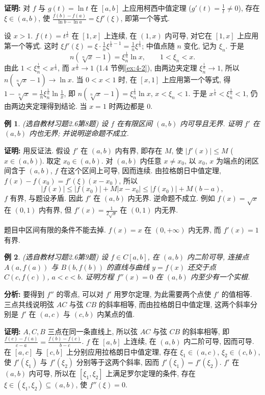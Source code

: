 \documentclass[UTF8,openany]{ctexbook}
\theoremstyle{chinesetextbook}
\newtheorem{example}{例}[section]
\newenvironment{cnproof}{\par\indent\textbf{证明:} \ignorespaces}{\par}
\begin{document}
\begin{cnproof}
对 $f$ 与 $g(t)=\ln t$ 在 $[a,b]$ 上应用柯西中值定理 ($\displaystyle g'(t)=\frac1t\ne0$), 存在 $\xi\in(a,b)$, 使 $\displaystyle\frac{f(b)-f(a)}{\ln b-\ln a}=\xi f'(\xi)$, 即第一个等式.

设 $x>1$. $f(t)=t^{\frac1n}$ 在 $[1,x]$ 上连续, 在 $(1,x)$ 内可导, 对它在 $[1,x]$ 上应用第一个等式. 这时 $\displaystyle\xi f'(\xi)=\xi\cdot\frac1n\xi^{\frac1n-1}=\frac1n\xi^{\frac1n}$; 中值点随 $n$ 变化, 记为 $\xi_n$. 于是
\[
n\left(\sqrt[n]x-1\right)=\xi_n^{\frac1n}\ln x,\qquad1<\xi_n<x.
\]
由此 $1<\xi_n^{\frac1n}<x^{\frac1n}$, 而 $x^{\frac1n}\to1$ (1.4 节例\ref{ex:4-2}), 由两边夹定理 $\xi_n^{\frac1n}\to1$, 所以 $n\left(\sqrt[n]x-1\right)\to\ln x$. 当 $0<x<1$ 时, 在 $[x,1]$ 上应用第一个等式, 得 $\displaystyle1-\sqrt[n]x=\frac1n\xi_n^{\frac1n}\ln\frac1x$, 即 $n\left(\sqrt[n]x-1\right)=\xi_n^{\frac1n}\ln x$, $x<\xi_n<1$. 于是 $x^{\frac1n}<\xi_n^{\frac1n}<1$, 仍由两边夹定理得到结论. 当 $x=1$ 时两边都是 $0$.
\end{cnproof}
\begin{example}\label{ex:c2-h6-8}
\textnormal{(选自教材习题2.6第8题)} 设 $f$ 在有限区间 $(a,b)$ 内可导且无界. 证明 $f'$ 在 $(a,b)$ 内也无界; 并说明逆命题不成立.
\end{example}
\begin{cnproof}
用反证法. 假设 $f'$ 在 $(a,b)$ 内有界, 即存在 $M$, 使 $|f'(x)|\le M$ ($x\in(a,b)$). 取定 $x_0\in(a,b)$. 对 $(a,b)$ 内任意 $x\ne x_0$, 以 $x_0$, $x$ 为端点的闭区间含于 $(a,b)$, $f$ 在这个区间上可导, 因而连续. 由拉格朗日中值定理, $f(x)-f(x_0)=f'(\xi)(x-x_0)$, 所以
\[
|f(x)|\le|f(x_0)|+M|x-x_0|\le|f(x_0)|+M(b-a),
\]
$f$ 有界, 与题设矛盾. 因此 $f'$ 在 $(a,b)$ 内无界. 逆命题不成立. 例如 $f(x)=\sqrt x$ 在 $(0,1)$ 内有界, 但 $\displaystyle f'(x)=\frac1{2\sqrt x}$ 在 $(0,1)$ 内无界.
\end{cnproof}
题目中区间有限的条件不能去掉. $f(x)=x$ 在 $(0,+\infty)$ 内无界, 而 $f'(x)=1$ 有界.
\begin{example}\label{ex:c2-h6-9}
\textnormal{(选自教材习题2.6第9题)} 设 $f\in C[a,b]$, 在 $(a,b)$ 内二阶可导, 连接点 $A(a,f(a))$ 与 $B(b,f(b))$ 的直线与曲线 $y=f(x)$ 还交于点 $C(c,f(c))$, $a<c<b$. 证明方程 $f''(x)=0$ 在 $(a,b)$ 内至少有一个实根.
\end{example}
\par\indent\textbf{分析:} 要得到 $f''$ 的零点, 可以对 $f'$ 用罗尔定理, 为此需要两个点使 $f'$ 的值相等. 三点共线说明弦 $AC$ 与弦 $CB$ 的斜率相等, 而由拉格朗日中值定理, 这两个斜率分别是 $f'$ 在 $(a,c)$ 与 $(c,b)$ 内某点的值.
\begin{cnproof}
$A,C,B$ 三点在同一条直线上, 所以弦 $AC$ 与弦 $CB$ 的斜率相等, 即 $\displaystyle\frac{f(c)-f(a)}{c-a}=\frac{f(b)-f(c)}{b-c}$. $f$ 在 $[a,b]$ 上连续, 在 $(a,b)$ 内二阶可导, 因而可导. 在 $[a,c]$ 与 $[c,b]$ 上分别应用拉格朗日中值定理, 存在 $\xi_1\in(a,c)$, $\xi_2\in(c,b)$, 使 $f'(\xi_1)$ 与 $f'(\xi_2)$ 分别等于这两个斜率, 因而 $f'(\xi_1)=f'(\xi_2)$. $f'$ 在 $(a,b)$ 内可导, 所以在 $[\xi_1,\xi_2]$ 上满足罗尔定理的条件, 存在 $\xi\in(\xi_1,\xi_2)\subseteq(a,b)$, 使 $f''(\xi)=0$.
\end{cnproof}
\end{document}

